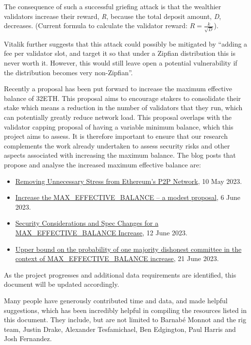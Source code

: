 \documentclass[UTF8]{article}
\begin{document}
The consequence of such a successful griefing attack is that the wealthier validators increase their reward, \textit{R}, because the total deposit amount, \textit{D}, decreases. (Current formula to calculate the validator reward: $R = \frac{k}{\sqrt{D}}$).

Vitalik further suggests that this attack could possibly be mitigated by ``adding a fee per validator slot, and target it so that under a Zipfian distribution this is never worth it. However, this would still leave open a potential vulnerability if the distribution becomes very non-Zipfian''. 

Recently a proposal has been put forward to increase the maximum effective balance of 32ETH. This proposal aims to encourage stakers to consolidate their stake which means a reduction in the number of validators that they run, which can potentially greatly reduce network load. This proposal overlaps with the validator capping proposal of having a variable minimum balance, which this project aims to assess. It is therefore important to ensure that our research complements the work already undertaken to assess security risks and other aspects associated with increasing the maximum balance. The blog posts that propose and analyse the increased maximum effective balance are:
\begin{itemize}
\item \href{https://ethresear.ch/t/removing-unnecessary-stress-from-ethereums-p2p-network/15547}{Removing Unnecessary Stress from Ethereum’s P2P Network}, 10 May 2023.
\item \href{https://ethresear.ch/t/increase-the-max-effective-balance-a-modest-proposal/15801/3}{Increase the MAX\_EFFECTIVE\_BALANCE – a modest proposal}, 6 June 2023.
\item \href{https://notes.ethereum.org/nHqON5l7SACkL_nPwz8Vqw}{Security Considerations and Spec Changes for a MAX\_EFFECTIVE\_BALANCE Increase}, 12 June 2023.
\item \href{https://hackmd.io/@0g8QuqEeQBe45CC8toURGw/HylpAVzIH2}{Upper bound on the probability of one majority dishonest committee in the context of MAX\_EFFECTIVE\_BALANCE increase}, 21 June 2023.
\end{itemize}


As the project progresses and additional data requirements are identified, this document will be updated accordingly.

Many people have generously contributed time and data, and made helpful suggestions, which has been incredibly helpful in compiling the resources listed in this document. They include, but are not limited to Barnabé Monnot and the \gls{rig} team, Justin Drake, Alexander Tesfamichael, Ben Edgington, Paul Harris and Josh Fernandez.
\end{document}
